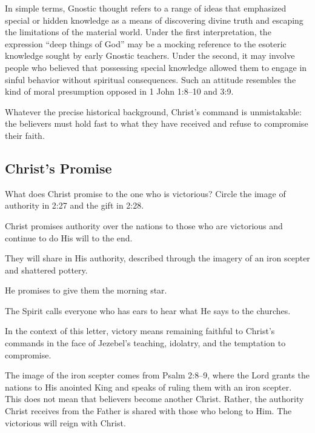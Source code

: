 In simple terms, Gnostic thought refers to a range of ideas that emphasized special or hidden knowledge as a means of discovering divine truth and escaping the limitations of the material world. Under the first interpretation, the expression ``deep things of God'' may be a mocking reference to the esoteric knowledge sought by early Gnostic teachers. Under the second, it may involve people who believed that possessing special knowledge allowed them to engage in sinful behavior without spiritual consequences. Such an attitude resembles the kind of moral presumption opposed in 1 John 1:8--10 and 3:9.

Whatever the precise historical background, Christ's command is unmistakable: the believers must hold fast to what they have received and refuse to compromise their faith.

\subsection{Christ's Promise}

\begin{ScriptureBox2}{What does Christ promise to the one who is victorious? Circle the image of authority in 2:27 and the gift in 2:28.}
\item[2:26] Christ promises authority over the nations to those who are victorious and continue to do His will to the end.

\item[2:27] They will share in His authority, described through the imagery of an iron scepter and shattered pottery.

\item[2:28] He promises to give them the morning star.

\item[2:29] The Spirit calls everyone who has ears to hear what He says to the churches.
\end{ScriptureBox2}

In the context of this letter, victory means remaining faithful to Christ's commands in the face of Jezebel's teaching, idolatry, and the temptation to compromise.

The image of the iron scepter comes from Psalm 2:8--9, where the Lord grants the nations to His anointed King and speaks of ruling them with an iron scepter. This does not mean that believers become another Christ. Rather, the authority Christ receives from the Father is shared with those who belong to Him. The victorious will reign with Christ.

